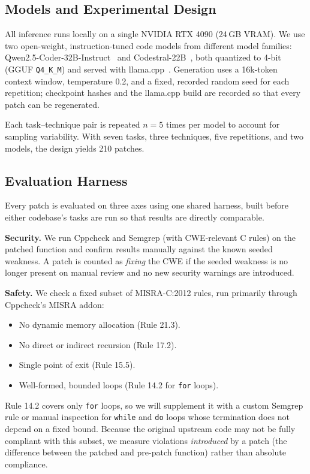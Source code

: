 \documentclass[12pt]{IEEEtran}
\begin{document}
\subsection{Models and Experimental Design}
All inference runs locally on a single NVIDIA RTX 4090 (24\,GB VRAM). We use two open-weight, instruction-tuned code models from different model families: Qwen2.5-Coder-32B-Instruct~\cite{qwen25coder} and Codestral-22B~\cite{codestral}, both quantized to 4-bit (GGUF \texttt{Q4\_K\_M}) and served with llama.cpp~\cite{llamacpp}. Generation uses a 16k-token context window, temperature 0.2, and a fixed, recorded random seed for each repetition; checkpoint hashes and the llama.cpp build are recorded so that every patch can be regenerated.

Each task--technique pair is repeated $n=5$ times per model to account for sampling variability. With seven tasks, three techniques, five repetitions, and two models, the design yields 210 patches.

\subsection{Evaluation Harness}
Every patch is evaluated on three axes using one shared harness, built before either codebase's tasks are run so that results are directly comparable.

\textbf{Security.} We run Cppcheck and Semgrep (with CWE-relevant C rules) on the patched function and confirm results manually against the known seeded weakness. A patch is counted as \emph{fixing} the CWE if the seeded weakness is no longer present on manual review and no new security warnings are introduced.

\textbf{Safety.} We check a fixed subset of MISRA-C:2012 rules, run primarily through Cppcheck's MISRA addon:
\begin{itemize}
    \item No dynamic memory allocation (Rule 21.3).
    \item No direct or indirect recursion (Rule 17.2).
    \item Single point of exit (Rule 15.5).
    \item Well-formed, bounded loops (Rule 14.2 for \texttt{for} loops).
\end{itemize}
Rule 14.2 covers only \texttt{for} loops, so we will supplement it with a custom Semgrep rule or manual inspection for \texttt{while} and \texttt{do} loops whose termination does not depend on a fixed bound. Because the original upstream code may not be fully compliant with this subset, we measure violations \emph{introduced} by a patch (the difference between the patched and pre-patch function) rather than absolute compliance.
\end{document}
